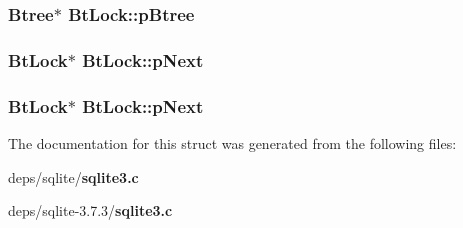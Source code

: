 \subsubsection{\setlength{\rightskip}{0pt plus 5cm}\bf{Btree}$\ast$ \bf{Bt\-Lock::p\-Btree}}\label{structBtLock_da80748a0aa7668b32b18302ea96cd2a}


\subsubsection{\setlength{\rightskip}{0pt plus 5cm}\bf{Bt\-Lock}$\ast$ \bf{Bt\-Lock::p\-Next}}\label{structBtLock_772124e4c65f48e1b26c48544150cc4b}


\subsubsection{\setlength{\rightskip}{0pt plus 5cm}\bf{Bt\-Lock}$\ast$ \bf{Bt\-Lock::p\-Next}}\label{structBtLock_772124e4c65f48e1b26c48544150cc4b}




The documentation for this struct was generated from the following files:\begin{CompactItemize}
\item 
deps/sqlite/\bf{sqlite3.c}\item 
deps/sqlite-3.7.3/\bf{sqlite3.c}\end{CompactItemize}
